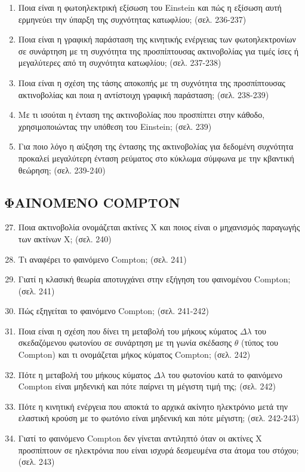 \documentclass{article}
\begin{document}
\begin{enumerate}
      \item Ποια είναι η φωτοηλεκτρική εξίσωση του Einstein και πώς η εξίσωση αυτή ερμηνεύει την ύπαρξη της συχνότητας κατωφλίου; (σελ. 236-237)

      \item Ποια είναι η γραφική παράσταση της κινητικής ενέργειας των φωτοηλεκτρονίων σε συνάρτηση με τη συχνότητα της προσπίπτουσας ακτινοβολίας για τιμές ίσες ή μεγαλύτερες από τη συχνότητα κατωφλίου; (σελ. 237-238)

      \item Ποια είναι η σχέση της τάσης αποκοπής με τη συχνότητα της προσπίπτουσας ακτινοβολίας και ποια η αντίστοιχη γραφική παράσταση; (σελ. 238-239)

      \item Με τι ισούται η ένταση της ακτινοβολίας που προσπίπτει στην κάθοδο, χρησιμοποιώντας την υπόθεση του Einstein; (σελ. 239)

      \item Για ποιο λόγο η αύξηση της έντασης της ακτινοβολίας για δεδομένη συχνότητα προκαλεί μεγαλύτερη ένταση ρεύματος στο κύκλωμα σύμφωνα με την κβαντική θεώρηση; (σελ. 239-240)
\end{enumerate}

\subsection{ΦΑΙΝΟΜΕΝΟ COMPTON}
\begin{enumerate}
      \setcounter{enumi}{26}
      \item Ποια ακτινοβολία ονομάζεται ακτίνες Χ και ποιος είναι ο μηχανισμός παραγωγής των ακτίνων Χ; (σελ. 240)

      \item Τι αναφέρει το φαινόμενο Compton; (σελ. 241)

      \item Γιατί η κλασική θεωρία αποτυγχάνει στην εξήγηση του φαινομένου Compton; (σελ. 241)

      \item Πώς εξηγείται το φαινόμενο Compton; (σελ. 241-242)

      \item Ποια είναι η σχέση που δίνει τη μεταβολή του μήκους κύματος $\Delta\lambda$ του σκεδαζόμενου φωτονίου σε συνάρτηση με τη γωνία σκέδασης $\theta$ (τύπος του Compton) και τι ονομάζεται μήκος κύματος Compton; (σελ. 242)

      \item Πότε η μεταβολή του μήκους κύματος $\Delta\lambda$ του φωτονίου κατά το φαινόμενο Compton είναι μηδενική και πότε παίρνει τη μέγιστη τιμή της; (σελ. 242)

      \item Πότε η κινητική ενέργεια που αποκτά το αρχικά ακίνητο ηλεκτρόνιο μετά την ελαστική κρούση με το φωτόνιο είναι μηδενική και πότε μέγιστη; (σελ. 242-243)

      \item Γιατί το φαινόμενο Compton δεν γίνεται αντιληπτό όταν οι ακτίνες Χ προσπίπτουν σε ηλεκτρόνια που είναι ισχυρά δεσμευμένα στα άτομα του στόχου; (σελ. 243)
\end{enumerate}
\end{document}
